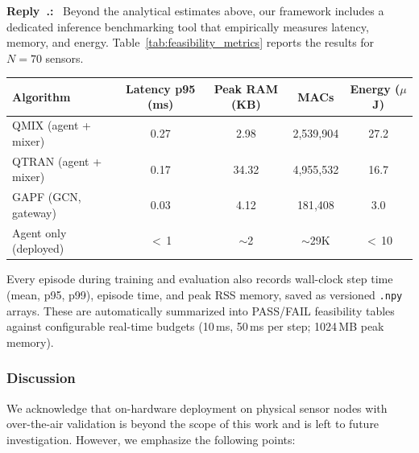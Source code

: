 \documentclass[11pt]{article}
\newcounter{reviewer}
\newcounter{point}[reviewer]
\newcounter{replyctr}[reviewer]
\renewcommand{\thereplyctr}{\thereviewer.\arabic{replyctr}}
\newenvironment{reply}
  {\refstepcounter{replyctr}%
   \addtocounter{replyctr}{-1}%
   \medskip\noindent
   \begin{sf}\textbf{Reply~\thereplyctr:}\ }
  {\addtocounter{replyctr}{1}%
   \medskip\end{sf}}
\begin{document}
\begin{refsection}
\begin{mdframed}[style=Resp]
\begin{reply}
Beyond the analytical estimates above, our framework includes a dedicated
inference benchmarking tool that empirically measures latency, memory, and
energy. Table~\ref{tab:feasibility_metrics} reports the results for $N = 70$
sensors.

\begin{center}
\label{tab:feasibility_metrics}
\renewcommand{\arraystretch}{1.15}
\begin{tabular}{@{}lcccc@{}}
\toprule
\textbf{Algorithm} & \textbf{Latency p95 (ms)} & \textbf{Peak RAM (KB)} & \textbf{MACs} & \textbf{Energy ($\mu$J)} \\
\midrule
QMIX (agent + mixer)  & 0.27  & 2.98  & 2{,}539{,}904 & 27.2 \\
QTRAN (agent + mixer)  & 0.17  & 34.32 & 4{,}955{,}532 & 16.7 \\
GAPF (GCN, gateway)    & 0.03  & 4.12  & 181{,}408            & 3.0  \\
\midrule
Agent only (deployed)   & $<$\,1          & $\sim$2          & $\sim$29K       & $<$\,10         \\
\bottomrule
\end{tabular}
\end{center}

Every episode during training and evaluation also records wall-clock step time
(mean, p95, p99), episode time, and peak RSS memory, saved as versioned
\texttt{.npy} arrays. These are automatically summarized into PASS/FAIL
feasibility tables against configurable real-time budgets (10\,ms, 50\,ms per
step; 1024\,MB peak memory).

\subsubsection{Discussion}

We acknowledge that on-hardware deployment on physical sensor nodes with
over-the-air validation is beyond the scope of this work and is left to future
investigation. However, we emphasize the following points:


\end{reply}
\end{mdframed}
\end{refsection}
\end{document}
